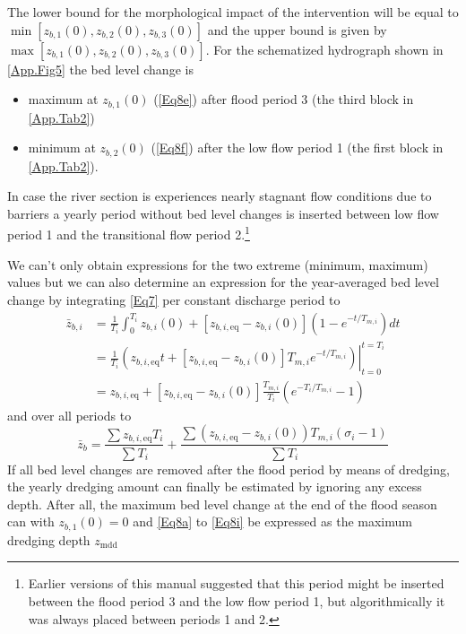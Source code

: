 The lower bound for the morphological impact of the intervention will be equal to $\min[z_{b,1}(0), z_{b,2}(0), z_{b,3}(0)]$ and the upper bound is given by $\max[z_{b,1}(0), z_{b,2}(0), z_{b,3}(0)]$.
For the schematized hydrograph shown in \autoref{App.Fig5} the bed level change is

\begin{itemize}
\item maximum at $z_{b,1}(0)$ (\autoref{Eq8e}) after flood period 3 (the third block in \autoref{App.Tab2})
\item minimum at $z_{b,2}(0)$ (\autoref{Eq8f}) after the low flow period 1 (the first block in \autoref{App.Tab2}).
\end{itemize}

In case the river section is experiences nearly stagnant flow conditions due to barriers a yearly period without bed level changes is inserted between low flow period 1 and the transitional flow period 2.\footnote{Earlier versions of this manual suggested that this period might be inserted between the flood period 3 and the low flow period 1, but algorithmically it was always placed between periods 1 and 2.}

We can't only obtain expressions for the two extreme (minimum, maximum) values but we can also determine an expression for the year-averaged bed level change by integrating \autoref{Eq7} per constant discharge period to
%
\begin{align}
\bar{z}_{b,i} &= \frac{1}{T_i} \int_0^{T_i}{z_{b,i} (0) + [z_{b,i,\text{eq}} - z_{b,i}(0)](1 - e^{-t/T_{m,i}})}dt \\
&= \frac{1}{T_i} \left . \left ( {z_{b,i,\text{eq}} t + [z_{b,i,\text{eq}} - z_{b,i}(0)]T_{m,i} e^{-t/T_{m,i}}} \right ) \right |_{t=0}^{t=T_i} \\
&= z_{b,i,\text{eq}} + [z_{b,i,\text{eq}} - z_{b,i}(0)] \frac{T_{m,i}}{T_i} ( e^{-T_i/T_{m,i}} - 1 )
\end{align}
%
and over all periods to
%
\begin{equation}
\bar{z}_b = \frac{\sum{z_{b,i,\text{eq}} T_i}}{\sum{T_i}} + \frac{\sum{(z_{b,i,\text{eq}}-z_{b,i}(0)) T_{m,i} (\sigma_i-1)}}{\sum{T_i}}
\label{Eq8h}
\end{equation}
%
If all bed level changes are removed after the flood period by means of dredging, the yearly dredging amount can finally be estimated by ignoring any excess depth.
After all, the maximum bed level change at the end of the flood season can with $z_{b,1}(0) = 0$ and \autoref{Eq8a} to \autoref{Eq8i} be expressed as the maximum dredging depth $z_\text{mdd}$

